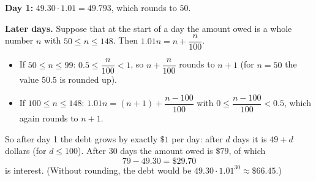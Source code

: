 \textbf{Day 1:} $49.30\cdot1.01=49.793$, which rounds to $50$.

\textbf{Later days.} Suppose that at the start of a day the amount owed is a whole number $n$ with $50\le n\le148$. Then $1.01n=n+\dfrac{n}{100}$.
\begin{itemize}
\item If $50\le n\le99$: $0.5\le\dfrac n{100}<1$, so $n+\dfrac n{100}$ rounds to $n+1$ (for $n=50$ the value $50.5$ is rounded up).
\item If $100\le n\le148$: $1.01n=(n+1)+\dfrac{n-100}{100}$ with $0\le\dfrac{n-100}{100}<0.5$, which again rounds to $n+1$.
\end{itemize}
So after day 1 the debt grows by exactly $\$1$ per day: after $d$ days it is $49+d$ dollars (for $d\le100$). After $30$ days the amount owed is $\boxed{\$79}$, of which
\[79-49.30=\boxed{\$29.70}\]
is interest. (Without rounding, the debt would be $49.30\cdot1.01^{30}\approx\$66.45$.)
